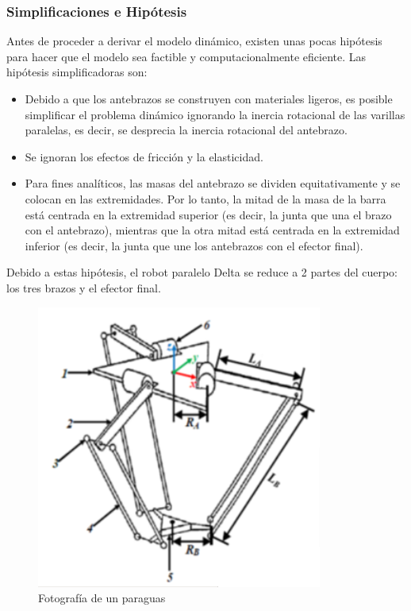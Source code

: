         \newpage

        \subsubsection{Simplificaciones e Hipótesis}
        Antes de proceder a derivar el modelo dinámico, existen unas pocas hipótesis para hacer que el modelo sea factible y computacionalmente eficiente. Las hipótesis simplificadoras son:
        
        \begin{itemize}
            \item Debido a que los antebrazos se construyen con materiales ligeros, es posible simplificar el problema dinámico ignorando la inercia rotacional de las varillas paralelas, es decir, se desprecia la inercia rotacional del antebrazo.
            \item Se ignoran los efectos de fricción y la elasticidad.
            \item Para fines analíticos, las masas del antebrazo se dividen equitativamente y se colocan en las extremidades. Por lo tanto, la mitad de la masa de la barra está centrada en la extremidad superior (es decir, la junta que una el brazo con el antebrazo), mientras que la otra mitad está centrada en la extremidad inferior (es decir, la junta que une los antebrazos con el efector final).
        \end{itemize}

        Debido a estas hipótesis, el robot paralelo Delta se reduce a 2 partes del cuerpo: los tres brazos y el efector final.
     
        \begin{figure}[H]
              \centering
	          \includegraphics[width=0.6\linewidth]{Main/Chapter4/Images4/cap4_dina_b_1.png}
              \caption{Fotografía de un paraguas}
              \label{f:Cap4_Metodo_B_Modelacion_Dinamica_1}
        \end{figure}
        

